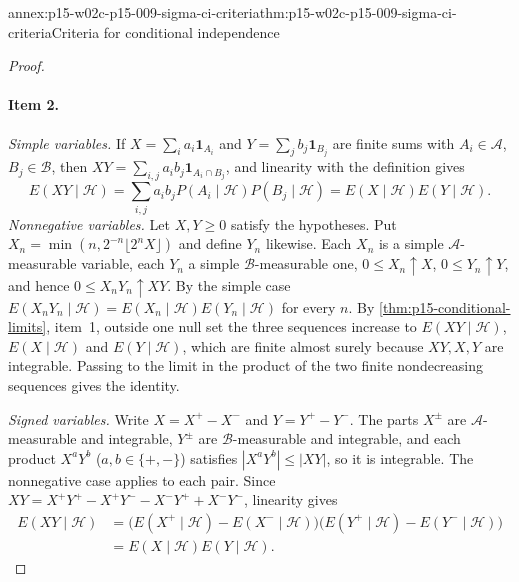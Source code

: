 \begin{annexitem}{annex:p15-w02c-p15-009-sigma-ci-criteria}{thm:p15-w02c-p15-009-sigma-ci-criteria}{Criteria for conditional independence}
\begin{proof}
\paragraph{Item 2.} \emph{Simple variables.} If
\(X=\sum_i a_i\mathbf1_{A_i}\) and \(Y=\sum_j b_j\mathbf1_{B_j}\) are finite
sums with \(A_i\in\mathcal A\), \(B_j\in\mathcal B\), then
\(XY=\sum_{i,j}a_ib_j\mathbf1_{A_i\cap B_j}\), and linearity with the
definition gives
\[
 E(XY\mid\mathcal H)=\sum_{i,j}a_ib_jP(A_i\mid\mathcal H)P(B_j\mid\mathcal H)
 =E(X\mid\mathcal H)E(Y\mid\mathcal H).
\]
\emph{Nonnegative variables.} Let \(X,Y\geq0\) satisfy the hypotheses. Put
\(X_n=\min(n,2^{-n}\lfloor2^nX\rfloor)\) and define \(Y_n\) likewise. Each
\(X_n\) is a simple \(\mathcal A\)-measurable variable, each \(Y_n\) a
simple \(\mathcal B\)-measurable one, \(0\leq X_n\uparrow X\),
\(0\leq Y_n\uparrow Y\), and hence \(0\leq X_nY_n\uparrow XY\). By the
simple case \(E(X_nY_n\mid\mathcal H)=E(X_n\mid\mathcal H)E(Y_n\mid\mathcal H)\)
for every \(n\). By \cref{thm:p15-conditional-limits}, item~1, outside one
null set the three sequences increase to \(E(XY\mid\mathcal H)\),
\(E(X\mid\mathcal H)\) and \(E(Y\mid\mathcal H)\), which are finite almost
surely because \(XY,X,Y\) are integrable. Passing to the limit in the
product of the two finite nondecreasing sequences gives the identity.

\emph{Signed variables.} Write \(X=X^+-X^-\) and \(Y=Y^+-Y^-\). The parts
\(X^\pm\) are \(\mathcal A\)-measurable and integrable, \(Y^\pm\) are
\(\mathcal B\)-measurable and integrable, and each product
\(X^aY^b\) (\(a,b\in\{+,-\}\)) satisfies \(|X^aY^b|\leq|XY|\), so it is
integrable. The nonnegative case applies to each pair. Since
\(XY=X^+Y^+-X^+Y^--X^-Y^++X^-Y^-\), linearity gives
\[
\begin{aligned}
 E(XY\mid\mathcal H)
 &=\bigl(E(X^+\mid\mathcal H)-E(X^-\mid\mathcal H)\bigr)
  \bigl(E(Y^+\mid\mathcal H)-E(Y^-\mid\mathcal H)\bigr)\\
 &=E(X\mid\mathcal H)E(Y\mid\mathcal H).
\end{aligned}
\]


\end{proof}
\end{annexitem}
